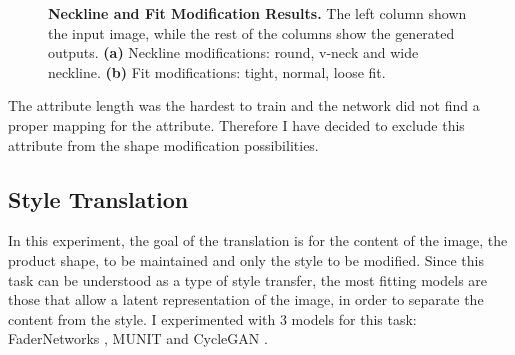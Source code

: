 \documentclass[12pt]{report}
\begin{document}
\begin{figure}[!h]
\centering
{}
\caption{\label{fig:neckline_results} \textbf{Neckline and Fit Modification Results.} The left column shown the input image, while the rest of the columns show the generated outputs. \textbf{(a)} Neckline modifications: round, v-neck and wide neckline. \textbf{(b)} Fit modifications: tight, normal, loose fit.}
\end{figure}

The attribute length was the hardest to train and the network did not find a proper mapping for the attribute. Therefore I have decided to exclude this attribute from the shape modification possibilities.

\pagebreak
\subsection{Style Translation}
In this experiment, the goal of the translation is for the content of the image, the product shape, to be maintained and only the style to be modified. Since this task can be understood as a type of style transfer, the most fitting models are those that allow a latent representation of the image, in order to separate the content from the style. I experimented with 3 models for this task: FaderNetworks \cite{lample_fader_2017}, MUNIT \cite{huang_multimodal_2018} and CycleGAN \cite{zhu_unpaired_2017}.
\end{document}
